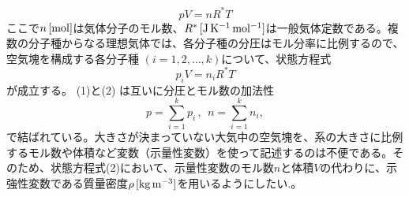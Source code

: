 \documentclass{jsarticle}
\begin{document}
\begin{equation}
 pV=nR^{*}T 
\end{equation}
ここで$n\,[\rm{mol}]$は気体分子のモル数、$R^{*}\,[\rm{J\,K^{-1}\,mol^{-1}}]$は一般気体定数である。複数の分子種からなる理想気体では、各分子種の分圧はモル分率に比例するので、空気塊を構成する各分子種 $(i = 1,2,\dots, k)$について、状態方程式
\begin{equation}
 p_{i}V=n_{i}R^{*}T 
\end{equation}
が成立する。 (1)と(2) は互いに分圧とモル数の加法性
\begin{equation}
 p=\sum_{i=1}^{k}p_{i}\,, \ \ n=\sum_{i=1}^{k}n_{i},
\end{equation}
で結ばれている。大きさが決まっていない大気中の空気塊を、系の大きさに比例するモル数や体積など変数（示量性変数）を使って記述するのは不便である。そのため、状態方程式(2)において、示量性変数のモル数$n$と体積$V$の代わりに、示強性変数である質量密度$\rho\,[\rm{kg\,m^{-3}}]$を用いるようにしたい.。
\end{document}
